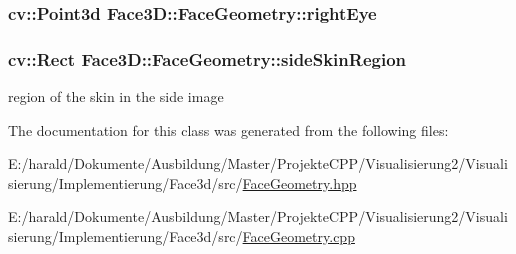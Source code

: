 \subsubsection[{\texorpdfstring{right\+Eye}{rightEye}}]{\setlength{\rightskip}{0pt plus 5cm}cv\+::\+Point3d Face3\+D\+::\+Face\+Geometry\+::right\+Eye\hspace{0.3cm}{\ttfamily [private]}}\hypertarget{class_face3_d_1_1_face_geometry_a2843e84aaa697a4cd418d1940378955b}{}\label{class_face3_d_1_1_face_geometry_a2843e84aaa697a4cd418d1940378955b}
\subsubsection[{\texorpdfstring{side\+Skin\+Region}{sideSkinRegion}}]{\setlength{\rightskip}{0pt plus 5cm}cv\+::\+Rect Face3\+D\+::\+Face\+Geometry\+::side\+Skin\+Region\hspace{0.3cm}{\ttfamily [private]}}\hypertarget{class_face3_d_1_1_face_geometry_a50fd03eb7de07088b36d3e4dea286b94}{}\label{class_face3_d_1_1_face_geometry_a50fd03eb7de07088b36d3e4dea286b94}


region of the skin in the side image 



The documentation for this class was generated from the following files\+:\begin{DoxyCompactItemize}
\item 
E\+:/harald/\+Dokumente/\+Ausbildung/\+Master/\+Projekte\+C\+P\+P/\+Visualisierung2/\+Visualisierung/\+Implementierung/\+Face3d/src/\hyperlink{_face_geometry_8hpp}{Face\+Geometry.\+hpp}\item 
E\+:/harald/\+Dokumente/\+Ausbildung/\+Master/\+Projekte\+C\+P\+P/\+Visualisierung2/\+Visualisierung/\+Implementierung/\+Face3d/src/\hyperlink{_face_geometry_8cpp}{Face\+Geometry.\+cpp}\end{DoxyCompactItemize}
